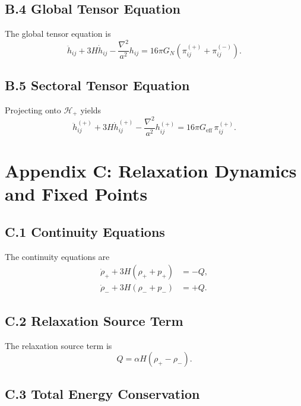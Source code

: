 \documentclass[11pt,a4paper]{article}
\begin{document}
\subsection*{B.4 Global Tensor Equation}

The global tensor equation is
\begin{equation}
\ddot{h}_{ij} + 3H \dot{h}_{ij} - \frac{\nabla^2}{a^2} h_{ij}
= 16\pi G_N \left( \pi_{ij}^{(+)} + \pi_{ij}^{(-)} \right).
\end{equation}

\subsection*{B.5 Sectoral Tensor Equation}

Projecting onto $\mathcal{H}_+$ yields
\begin{equation}
\ddot{h}_{ij}^{(+)} + 3H \dot{h}_{ij}^{(+)} - \frac{\nabla^2}{a^2} h_{ij}^{(+)}
= 16\pi G_{\mathrm{eff}} \, \pi_{ij}^{(+)}.
\end{equation}

\section*{Appendix C: Relaxation Dynamics and Fixed Points}

\subsection*{C.1 Continuity Equations}

The continuity equations are
\begin{align}
\dot{\rho}_+ + 3H(\rho_+ + p_+) &= -Q, \\
\dot{\rho}_- + 3H(\rho_- + p_-) &= +Q.
\end{align}

\subsection*{C.2 Relaxation Source Term}

The relaxation source term is
\begin{equation}
Q = \alpha H (\rho_+ - \rho_-).
\end{equation}

\subsection*{C.3 Total Energy Conservation}
\end{document}
